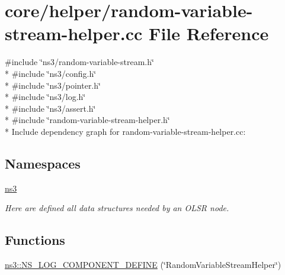 \hypertarget{random-variable-stream-helper_8cc}{}\section{core/helper/random-\/variable-\/stream-\/helper.cc File Reference}
\label{random-variable-stream-helper_8cc}
{\ttfamily \#include \char`\"{}ns3/random-\/variable-\/stream.\+h\char`\"{}}\\*
{\ttfamily \#include \char`\"{}ns3/config.\+h\char`\"{}}\\*
{\ttfamily \#include \char`\"{}ns3/pointer.\+h\char`\"{}}\\*
{\ttfamily \#include \char`\"{}ns3/log.\+h\char`\"{}}\\*
{\ttfamily \#include \char`\"{}ns3/assert.\+h\char`\"{}}\\*
{\ttfamily \#include \char`\"{}random-\/variable-\/stream-\/helper.\+h\char`\"{}}\\*
Include dependency graph for random-\/variable-\/stream-\/helper.cc\+:
\subsection*{Namespaces}
\begin{DoxyCompactItemize}
\item 
 \hyperlink{namespacens3}{ns3}
\begin{DoxyCompactList}\small\item\em Here are defined all data structures needed by an O\+L\+SR node. \end{DoxyCompactList}\end{DoxyCompactItemize}
\subsection*{Functions}
\begin{DoxyCompactItemize}
\item 
\hyperlink{namespacens3_a590bc994b380ba537e0876efec43d476}{ns3\+::\+N\+S\+\_\+\+L\+O\+G\+\_\+\+C\+O\+M\+P\+O\+N\+E\+N\+T\+\_\+\+D\+E\+F\+I\+NE} (\char`\"{}Random\+Variable\+Stream\+Helper\char`\"{})
\end{DoxyCompactItemize}
